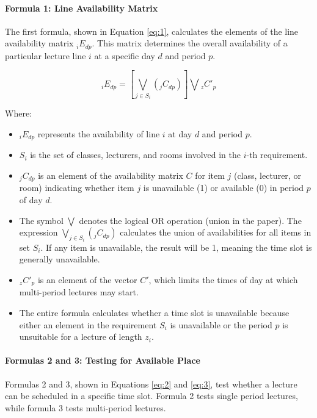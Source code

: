 \paragraph{Formula 1: Line Availability Matrix}

The first formula, shown in Equation \ref{eq:1}, calculates the elements of the line availability matrix \( _iE_{dp} \).
This matrix determines the overall availability of a particular lecture line \( i \) at a specific day \( d \) and period \( p \).

\begin{equation}
\label{eq:1}
_iE_{dp} = \left[\bigvee_{j \in S_i} (_jC_{dp})\right] \bigvee {}_zC'_{p}
\end{equation}

Where:
\begin{itemize}
    \item \( _iE_{dp} \) represents the availability of line \( i \) at day \( d \) and period \( p \).
    \item \( S_i \) is the set of classes, lecturers, and rooms involved in the \( i \)-th requirement.
    \item \( _jC_{dp} \) is an element of the availability matrix \( C \) for item \( j \) (class, lecturer, or room) indicating whether item \( j \) is unavailable (1) or available (0) in period \( p \) of day \( d \).
    \item The symbol \(\bigvee\) denotes the logical OR operation (union in the paper).
	The expression \(\bigvee_{j \in S_i} (_jC_{dp})\) calculates the union of availabilities for all items in set \( S_i \).
	If any item is unavailable, the result will be 1, meaning the time slot is generally unavailable.
    \item \( _zC'_{p} \) is an element of the vector \( C' \), which limits the times of day at which multi-period lectures may start. 
    \item The entire formula calculates whether a time slot is unavailable because either an element in the requirement \( S_i \) is unavailable or the period \( p \) is unsuitable for a lecture of length \( z_i \).
\end{itemize}

\paragraph{Formulas 2 and 3: Testing for Available Place}

Formulas 2 and 3, shown in Equations \ref{eq:2} and \ref{eq:3}, test whether a lecture can be scheduled in a specific time slot.
Formula 2 tests single period lectures, while formula 3 tests multi-period lectures.

